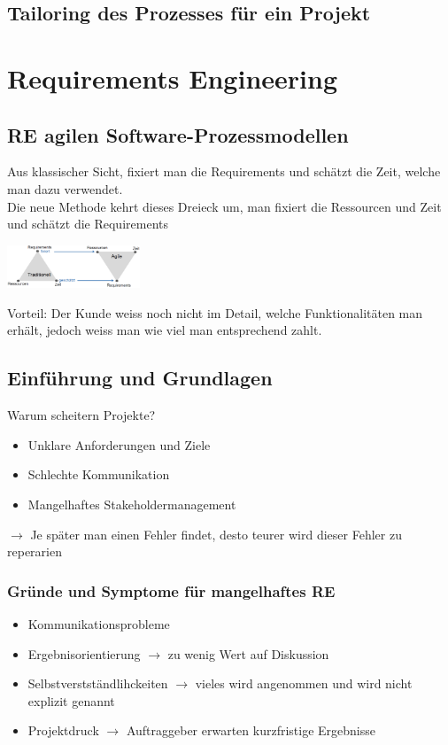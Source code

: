 \documentclass{report}
\newenvironment{Figure}
	{\par\medskip\noindent\minipage{\linewidth}}
	{\endminipage\par\medskip}
\theoremstyle{definition}
\theoremstyle{example}
\begin{document}
\section{Tailoring des Prozesses für ein Projekt}

\chapter{Requirements Engineering}

\section{RE agilen Software-Prozessmodellen}
Aus klassischer Sicht, fixiert man die Requirements und schätzt die Zeit, welche man dazu verwendet.\\
Die neue Methode kehrt dieses Dreieck um, man fixiert die Ressourcen und Zeit und schätzt die Requirements
\begin{Figure}
   \centering
    \includegraphics[width=150px]{img/REToday.png}
        \label{fig:Vergleich des Requirements Engineerings von frueher zu heute}
\end{Figure}
Vorteil: Der Kunde weiss noch nicht im Detail, welche Funktionalitäten man erhält, jedoch weiss man wie viel man entsprechend zahlt.

\section{Einführung und Grundlagen}
Warum scheitern Projekte?
\begin{itemize}
   \item Unklare Anforderungen und Ziele
   \item Schlechte Kommunikation
   \item Mangelhaftes Stakeholdermanagement
\end{itemize}
$\rightarrow$ Je später man einen Fehler findet, desto teurer wird dieser Fehler zu reperarien

\subsection{Gründe und Symptome für mangelhaftes RE}
\begin{itemize}
   \item Kommunikationsprobleme
   \item Ergebnisorientierung $\rightarrow$ zu wenig Wert auf Diskussion
   \item Selbstverstständlihckeiten $\rightarrow$ vieles wird angenommen und wird nicht explizit genannt
   \item Projektdruck $\rightarrow$ Auftraggeber erwarten kurzfristige Ergebnisse 
\end{itemize}
\end{document}

